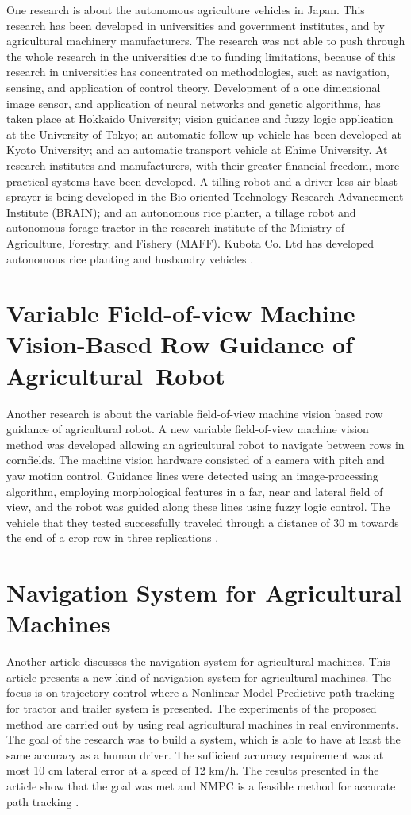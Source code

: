 One research is about the autonomous agriculture vehicles in Japan. This research has been developed in universities and government institutes, and by agricultural machinery manufacturers. The research was not able to push through the whole research in the universities due to funding limitations, because of this research in universities has concentrated on methodologies, such as navigation, sensing, and application of control theory. Development of a one dimensional image sensor, and application of neural networks and genetic algorithms, has taken place at Hokkaido University; vision guidance and fuzzy logic application at the University of Tokyo; an automatic follow-up vehicle has been developed at Kyoto University; and an automatic transport vehicle at Ehime University. At research institutes and manufacturers, with their greater financial freedom, more practical systems have been developed. A tilling robot and a driver-less air blast sprayer is being developed in the Bio-oriented Technology Research Advancement Institute (BRAIN); and an autonomous rice planter, a tillage robot and autonomous forage tractor in the research institute of the Ministry of Agriculture, Forestry, and Fishery (MAFF). Kubota Co. Ltd has developed autonomous rice planting and husbandry vehicles \cite{Torii2000}. 

\section{Variable Field-of-view Machine Vision-Based Row Guidance of Agricultural~Robot}

Another research is about the variable field-of-view machine vision based row guidance of agricultural robot. A new variable field-of-view machine vision method was developed allowing an agricultural robot to navigate between rows in cornfields. The machine vision hardware consisted of a camera with pitch and yaw motion control. Guidance lines were detected using an image-processing algorithm, employing morphological features in a far, near and lateral field of view, and the robot was guided along these lines using fuzzy logic control. The vehicle that they tested successfully traveled through a distance of 30 m towards the end of a crop row in three replications \cite{Xue2012}. 

\section{Navigation System for Agricultural Machines}

Another article discusses the navigation system for agricultural machines. This article presents a new kind of navigation system for agricultural machines. The focus is on trajectory control where a Nonlinear Model Predictive path tracking for tractor and trailer system is presented. The experiments of the proposed method are carried out by using real agricultural machines in real environments. The goal of the research was to build a system, which is able to have at least the same accuracy as a human driver. The sufficient accuracy requirement was at most 10 cm lateral error at a speed of 12 km/h. The results presented in the article show that the goal was met and NMPC is a feasible method for accurate path tracking \cite{Backman2011}. 